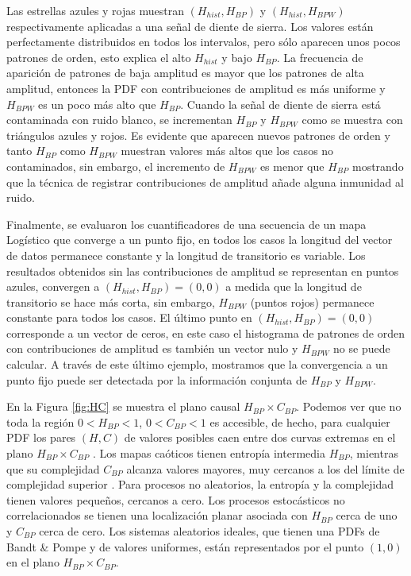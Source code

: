 Las estrellas azules y rojas muestran $(H_{hist}, H_{BP})$ y $ (H_{hist}, H_{BPW})$ respectivamente aplicadas a una señal de diente de sierra.
Los valores están perfectamente distribuidos en todos los intervalos, pero sólo aparecen unos pocos patrones de orden, esto explica el alto $H_{hist}$ y bajo $H_{BP}$.
La frecuencia de aparición de patrones de baja amplitud es mayor que los patrones de alta amplitud, entonces la PDF con contribuciones de amplitud es más uniforme y $H_{BPW}$ es un poco más alto que $H_{BP}$.
Cuando la señal de diente de sierra está contaminada con ruido blanco, se incrementan $H_ {BP}$ y $H_ {BPW}$ como se muestra con triángulos azules y rojos.
Es evidente que aparecen nuevos patrones de orden y tanto $H_{BP}$ como $H_{BPW}$ muestran valores más altos que los casos no contaminados, sin embargo, el incremento de $H_{BPW}$ es menor que $H_{BP}$ mostrando que la técnica de registrar contribuciones de amplitud añade alguna inmunidad al ruido.

Finalmente, se evaluaron los cuantificadores de una secuencia de un mapa Logístico que converge a un punto fijo, en todos los casos la longitud del vector de datos permanece constante y la longitud de transitorio es variable.
Los resultados obtenidos sin las contribuciones de amplitud se representan en puntos azules, convergen a $(H_{hist}, H_{BP}) = (0, 0)$ a medida que la longitud de transitorio se hace más corta, sin embargo, $H_{BPW}$ (puntos rojos) permanece constante para todos los casos.
El último punto en $(H_{hist}, H_{BP}) = (0, 0)$ corresponde a un vector de ceros, en este caso el histograma de patrones de orden con contribuciones de amplitud es también un vector nulo y $H_{BPW}$ no se puede calcular.
A través de este último ejemplo, mostramos que la convergencia a un punto fijo puede ser detectada por la información conjunta de $H_{BP}$ y $H_{BPW}$.

En la Figura \ref{fig:HC} se muestra el plano causal $H_{BP} \times C_{BP}$.
Podemos ver que no toda la región $0 < H_{BP} < 1$, $0 < C_{BP} < 1$ es accesible, de hecho, para cualquier PDF los pares $(H, C)$ de valores posibles caen entre dos curvas extremas en el plano $H_{BP} \times C_{BP}$ \cite{Anteneodo1996}.
Los mapas caóticos tienen entropía intermedia $H_{BP}$, mientras que su complejidad $C_{BP}$ alcanza valores mayores, muy cercanos a los del límite de complejidad superior \cite{Rosso2007, Olivares2012}.
Para procesos no aleatorios, la entropía y la complejidad tienen valores pequeños, cercanos a cero.
Los procesos estocásticos no correlacionados se tienen una localización planar asociada con $H_{BP}$ cerca de uno y $C_{BP}$ cerca de cero.
Los sistemas aleatorios ideales, que tienen una PDFs de Bandt \& Pompe y de valores uniformes, están representados por el punto $(1,0)$ \cite{Gonzalez2005} en el plano $H_{BP} \times C_{BP}$.

